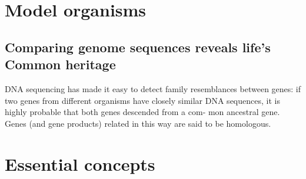 \section{Model organisms}

\subsection{Comparing genome sequences reveals life’s Common heritage}

DNA sequencing has made it easy to detect family resemblances between
genes: if two genes from different organisms have closely similar DNA
sequences, it is highly probable that both genes descended from a com-
mon ancestral gene. Genes (and gene products) related in this way are
said to be homologous.

\section{Essential concepts}

